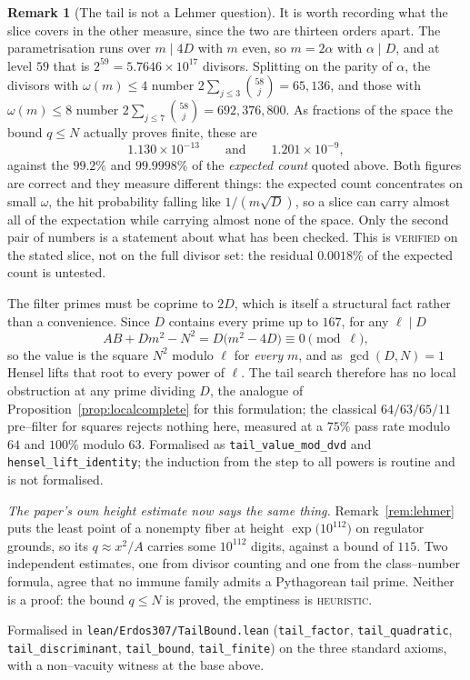\documentclass[11pt]{article}
\theoremstyle{definition}
\newtheorem{remark}[theorem]{Remark}
\begin{document}
\begin{remark}[The tail is not a Lehmer question]
It is worth recording what the slice covers in the other measure, since the two are thirteen orders
apart. The parametrisation runs over $m\mid4D$ with $m$ even, so $m=2\alpha$ with $\alpha\mid D$, and
at level $59$ that is $2^{59}=5.7646\times10^{17}$ divisors. Splitting on the parity of $\alpha$, the
divisors with $\omega(m)\le4$ number $2\sum_{j\le3}\binom{58}{j}=65{,}136$, and those with
$\omega(m)\le8$ number $2\sum_{j\le7}\binom{58}{j}=692{,}376{,}800$. As fractions of the space the
bound $q\le N$ actually proves finite, these are
\[ 1.130\times10^{-13}\qquad\text{and}\qquad 1.201\times10^{-9}, \]
against the $99.2\%$ and $99.9998\%$ of the \emph{expected count} quoted above. Both figures are
correct and they measure different things: the expected count concentrates on small $\omega$, the hit
probability falling like $1/(m\sqrt D)$, so a slice can carry almost all of the expectation while
carrying almost none of the space. Only the second pair of numbers is a statement about what has
been checked. This is \textsc{verified} on the stated slice, not on the
full divisor set: the residual $0.0018\%$ of the expected count is untested.

The filter primes must be coprime to $2D$, which is itself a structural fact rather than a
convenience. Since $D$ contains every prime up to $167$, for any $\ell\mid D$
\[ AB+Dm^2-N^2=D\bigl(m^2-4D\bigr)\equiv0 \pmod{\ell}, \]
so the value is the square $N^2$ modulo $\ell$ for \emph{every} $m$, and as $\gcd(D,N)=1$ Hensel
lifts that root to every power of $\ell$. The tail search therefore has no local obstruction at any
prime dividing $D$, the analogue of Proposition~\ref{prop:localcomplete} for this formulation; the
classical $64/63/65/11$ pre--filter for squares rejects nothing here, measured at a $75\%$ pass rate
modulo $64$ and $100\%$ modulo $63$. Formalised as \texttt{tail\_value\_mod\_dvd} and
\texttt{hensel\_lift\_identity}; the induction from the step to all powers is routine and is not
formalised.

\emph{The paper's own height estimate now says the same thing.} Remark~\ref{rem:lehmer} puts the
least point of a nonempty fiber at height $\exp\bigl(10^{112}\bigr)$ on regulator grounds, so its
$q\approx x^2/A$ carries some $10^{112}$ digits, against a bound of $115$. Two independent estimates,
one from divisor counting and one from the class--number formula, agree that no immune family admits
a Pythagorean tail prime. Neither is a proof: the bound $q\le N$ is proved, the emptiness is
\textsc{heuristic}.

Formalised in \texttt{lean/Erdos307/TailBound.lean} (\texttt{tail\_factor}, \texttt{tail\_quadratic},
\texttt{tail\_discriminant}, \texttt{tail\_bound}, \texttt{tail\_finite}) on the three standard
axioms, with a non--vacuity witness at the base above.
\end{remark}
\end{document}
